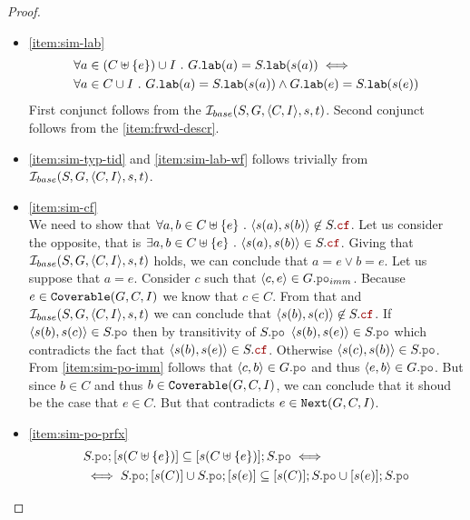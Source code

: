 \documentclass[12pt]{article}
\begin{document}
\begin{proof}
\begin{itemize}

  \item \ref{item:sim-lab} \\
    \begin{equation}
      \begin{split}
        & \forall{a \in (C \uplus \{e\}) \cup I} ~.~ G.{\mathtt{lab}}(a) = S.{\mathtt{lab}}(s(a)) \iff \\
        & \forall{a \in C \cup I} ~.~
          G.{\mathtt{lab}}(a) = S.{\mathtt{lab}}(s(a)) \wedge G.{\mathtt{lab}}(e) = S.{\mathtt{lab}}(s(e))
      \end{split}
    \end{equation}
    First conjunct follows from the $\mathcal{I}_{base}(S, G, \langle C, I \rangle, s, t)$.
    Second conjunct follows from the \ref{item:frwd-descr}.

  \item \ref{item:sim-typ-tid} and \ref{item:sim-lab-wf}
    follows trivially from $\mathcal{I}_{base}(S, G, \langle C, I \rangle, s, t)$.
    
  \item \ref{item:sim-cf} \\
    We need to show that
    $\forall{a, b \in \lC \uplus \{e\}} ~.~ \tup{s(a), s(b)} \not\in S.\lCF$.
    Let us consider the opposite, that is
    $\exists{a, b \in \lC \uplus \{e\}} ~.~ \tup{s(a), s(b)} \in S.\lCF$.
    Giving that $\mathcal{I}_{base}(S, G, \langle C, I \rangle, s, t)$ holds,
    we can conclude that \mbox{$a = e \vee b = e$}.
    Let us suppose that $a = e$.
    Consider $c$ such that $\tup{c, e} \in G.\lPO_{imm}$.
    Because $e \in {\mathtt{Coverable}}(G, C, I)$ we know that $c \in C$.
    From that and $\mathcal{I}_{base}(S, G, \langle C, I \rangle, s, t)$
    we can conclude that $\tup{s(b), s(c)} \not\in S.\lCF$.
    If $\tup{s(b), s(c)} \in S.\lPO$ then by transitivity of $S.\lPO$
    $\tup{s(b), s(e)} \in S.\lPO$
    which contradicts the fact that $\tup{s(b), s(e)} \in S.\lCF$.
    Otherwise \mbox{$\tup{s(c), s(b)} \in S.\lPO$}.
    From \ref{item:sim-po-imm} follows that $\tup{c, b} \in G.\lPO$
    and thus $\tup{e, b} \in G.\lPO$.
    But since $b \in C$ and thus $b \in {\mathtt{Coverable}}(G, C, I)$,
    we can conclude that it shoud be the case that $e \in C$.
    But that contradicts $e \in {\mathtt{Next}}(G, C, I)$.

  \item \ref{item:sim-po-prfx} \\

    \begin{equation*}
      \begin{split}
        &     S.\lPO;[s(C \uplus \{e\})] \subseteq [s(C \uplus \{e\})];S.\lPO \iff \\
        &\iff S.\lPO;[s(C)] \cup S.\lPO;[s(e)] \subseteq [s(C)];S.\lPO \cup [s(e)];S.\lPO
      \end{split}
    \end{equation*}


\end{itemize}
\end{proof}
\end{document}
